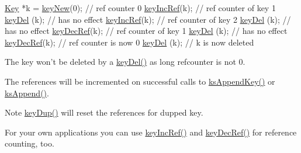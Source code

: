 \begin{DoxyCodeInclude}
\hyperlink{classkdb_1_1Key_a5679f5cae63caddd64a60388b9cc77fa}{Key} *k = \hyperlink{group__key_gad23c65b44bf48d773759e1f9a4d43b89}{keyNew}(0); \textcolor{comment}{// ref counter 0}
\hyperlink{group__key_ga6970a6f254d67af7e39f8e469bb162f1}{keyIncRef}(k); \textcolor{comment}{// ref counter of key 1}
\hyperlink{group__key_ga3df95bbc2494e3e6703ece5639be5bb1}{keyDel} (k);   \textcolor{comment}{// has no effect}
\hyperlink{group__key_ga6970a6f254d67af7e39f8e469bb162f1}{keyIncRef}(k); \textcolor{comment}{// ref counter of key 2}
\hyperlink{group__key_ga3df95bbc2494e3e6703ece5639be5bb1}{keyDel} (k);   \textcolor{comment}{// has no effect}
\hyperlink{group__key_ga2c6433ca22109e4e141946057eccb283}{keyDecRef}(k); \textcolor{comment}{// ref counter of key 1}
\hyperlink{group__key_ga3df95bbc2494e3e6703ece5639be5bb1}{keyDel} (k);   \textcolor{comment}{// has no effect}
\hyperlink{group__key_ga2c6433ca22109e4e141946057eccb283}{keyDecRef}(k); \textcolor{comment}{// ref counter is now 0}
\hyperlink{group__key_ga3df95bbc2494e3e6703ece5639be5bb1}{keyDel} (k); \textcolor{comment}{// k is now deleted}
\end{DoxyCodeInclude}
 The key won't be deleted by a \hyperlink{group__key_ga3df95bbc2494e3e6703ece5639be5bb1}{key\-Del()} as long refcounter is not 0.

The references will be incremented on successful calls to \hyperlink{group__keyset_gaa5a1d467a4d71041edce68ea7748ce45}{ks\-Append\-Key()} or \hyperlink{group__keyset_ga21eb9c3a14a604ee3a8bdc779232e7b7}{ks\-Append()}.

\begin{DoxyNote}{Note}
\hyperlink{group__key_gae6ec6a60cc4b8c1463fa08623d056ce3}{key\-Dup()} will reset the references for dupped key.
\end{DoxyNote}
For your own applications you can use \hyperlink{group__key_ga6970a6f254d67af7e39f8e469bb162f1}{key\-Inc\-Ref()} and \hyperlink{group__key_ga2c6433ca22109e4e141946057eccb283}{key\-Dec\-Ref()} for reference counting, too.


